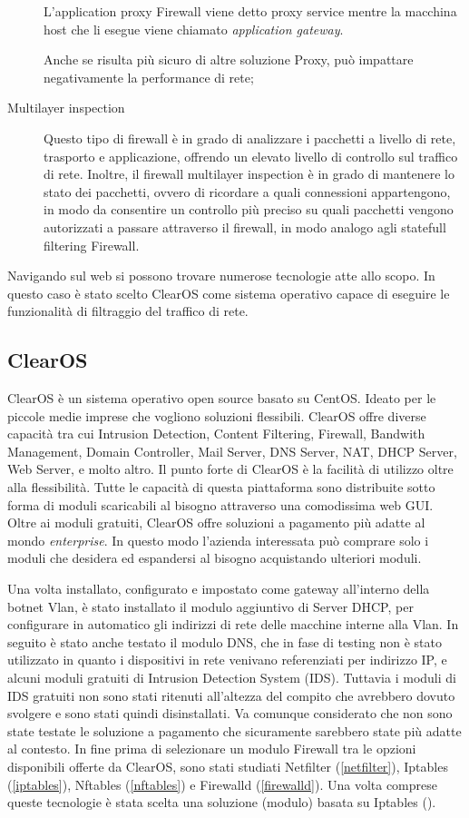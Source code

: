 \begin{description}
    L'application proxy Firewall viene detto proxy service mentre la macchina host che li esegue viene chiamato \textit{application gateway}.

    Anche se risulta più sicuro di altre soluzione Proxy, può impattare negativamente la performance di rete;
    \item[Multilayer inspection] Questo tipo di firewall è in grado di analizzare i pacchetti a livello di rete, trasporto e applicazione, offrendo un elevato livello di controllo sul traffico di rete. Inoltre, il firewall multilayer inspection è in grado di mantenere lo stato dei pacchetti, ovvero di ricordare a quali connessioni appartengono, in modo da consentire un controllo più preciso su quali pacchetti vengono autorizzati a passare attraverso il firewall, in modo analogo agli statefull filtering Firewall.


\end{description}
Navigando sul web si possono trovare numerose tecnologie atte allo scopo. In questo caso è stato scelto ClearOS come sistema operativo capace di eseguire le funzionalità di filtraggio del traffico di rete. 
\subsection{ClearOS}
\label{ClearOS}
ClearOS \cite{clearos} è un sistema operativo open source basato su CentOS. Ideato per le piccole medie imprese che vogliono soluzioni flessibili. ClearOS offre diverse capacità tra cui Intrusion Detection, Content Filtering, Firewall, Bandwith Management, Domain Controller, Mail Server, DNS Server, NAT, DHCP Server, Web Server, e molto altro.
Il punto forte di ClearOS è la facilità di utilizzo oltre alla flessibilità. Tutte le capacità di questa piattaforma sono distribuite sotto forma di moduli scaricabili al bisogno attraverso una comodissima web GUI. Oltre ai moduli gratuiti, ClearOS offre soluzioni a pagamento più adatte al mondo \textit{enterprise}. In questo modo l'azienda interessata può comprare solo i moduli che desidera ed espandersi al bisogno acquistando ulteriori moduli. 

Una volta installato, configurato e impostato come gateway all'interno della botnet Vlan, è stato installato il modulo aggiuntivo di Server DHCP, per configurare in automatico gli indirizzi di rete delle macchine interne alla Vlan.
In seguito è stato anche testato il modulo DNS, che in fase di testing non è stato utilizzato in quanto i dispositivi in rete venivano referenziati per indirizzo IP, e alcuni moduli gratuiti di Intrusion Detection System (IDS). Tuttavia i moduli di IDS gratuiti non sono stati ritenuti all'altezza del compito che avrebbero dovuto svolgere e sono stati quindi disinstallati. Va comunque considerato che non sono state testate le soluzione a pagamento che sicuramente sarebbero state più adatte al contesto. 
In fine prima di selezionare un modulo Firewall tra le opzioni disponibili offerte da  ClearOS, sono stati studiati Netfilter (\ref{netfilter}), Iptables (\ref{iptables}), Nftables (\ref{nftables}) e Firewalld (\ref{firewalld}). Una volta comprese queste tecnologie è stata scelta una soluzione (modulo) basata su Iptables ().

